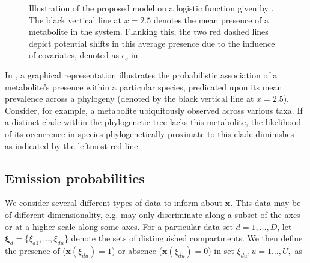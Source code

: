 \documentclass[
11pt, %
oneside, %
english, %
singlespacing, %
headsepline, %
chapterinoneline, %
]{MastersDoctoralThesis} %
\def\x{\boldsymbol{x}}
\def\bxi{\boldsymbol{\xi}}
\begin{document}
\begin{figure}[h]
	\centering
	\caption{Illustration of the proposed model on a logistic function given by . The black vertical line at $x=2.5$ denotes the mean presence of a metabolite in the system. Flanking this, the two red dashed lines depict potential shifts in this average presence due to the influence of covariates, denoted as $\epsilon_c$ in .}
	\label{fig: example sigmoid function}
\end{figure}

In , a graphical representation illustrates the probabilistic association of a metabolite's presence within a particular species, predicated upon its mean prevalence across a phylogeny (denoted by the black vertical line at $x=2.5$). Consider, for example, a metabolite ubiquitously observed across various taxa. If a distinct clade within the phylogenetic tree lacks this metabolite, the likelihood of its occurrence in species phylogenetically proximate to this clade diminishes — as indicated by the leftmost red line.
	
	\subsection{Emission probabilities}\label{subsec:emission probabilities}
	We consider several different types of data to inform about $\x$. This data may be of different dimensionality, e.g. may only discriminate along a subset of the axes or at a higher scale along some axes. For a particular data set $d=1, \ldots, D$, let $\bxi_d=\{\xi_{d1}, \ldots, \xi_{du}\}$ denote the sets of distinguished compartments. We then define the presence of ($\x(\xi_{du})=1$) or absence ($\x(\xi_{du})=0$) in set $\xi_{du}, u=1\ldots,U,$ as
	
\end{document}
